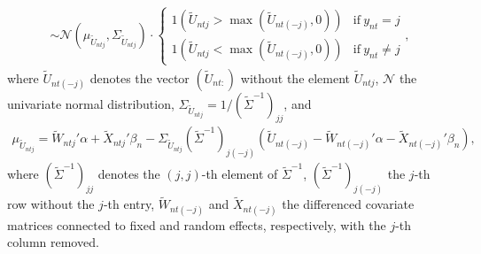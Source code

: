 \documentclass[article,shortnames]{jss}
\begin{document}
\begin{itemize}
\begin{align*}
  \sim \mathcal{N}(\mu_{\tilde{U}_{ntj}},\Sigma_{\tilde{U}_{ntj}}) \cdot \begin{cases}
  1(\tilde{U}_{ntj}>\max(\tilde{U}_{nt(-j)},0) ) & \text{if}~ y_{nt}=j\\
  1(\tilde{U}_{ntj}<\max(\tilde{U}_{nt(-j)},0) ) & \text{if}~ y_{nt}\neq j
  \end{cases},
  \end{align*}
  where $\tilde{U}_{nt(-j)}$ denotes the vector $(\tilde{U}_{nt:})$ without the element $\tilde{U}_{ntj}$, $\mathcal{N}$ the univariate normal distribution, $\Sigma_{\tilde{U}_{ntj}} = 1/(\tilde{\Sigma}^{-1})_{jj}$, and
  \begin{align*}
  \mu_{\tilde{U}_{ntj}} = \tilde{W}_{ntj}'\alpha + \tilde{X}_{ntj}'\beta_n - \Sigma_{\tilde{U}_{ntj}} (\tilde{\Sigma}^{-1})_{j(-j)}   (\tilde{U}_{nt(-j)} - \tilde{W}_{nt(-j)}'\alpha - \tilde{X}_{nt(-j)}' \beta_n ),
  \end{align*}
  where $(\tilde{\Sigma}^{-1})_{jj}$ denotes the $(j,j)$-th element of $\tilde{\Sigma}^{-1}$, $(\tilde{\Sigma}^{-1})_{j(-j)}$ the $j$-th row without the $j$-th entry, $\tilde{W}_{nt(-j)}$ and $\tilde{X}_{nt(-j)}$ the differenced covariate matrices connected to fixed and random effects, respectively, with the $j$-th column removed.


\end{itemize}
\end{document}
